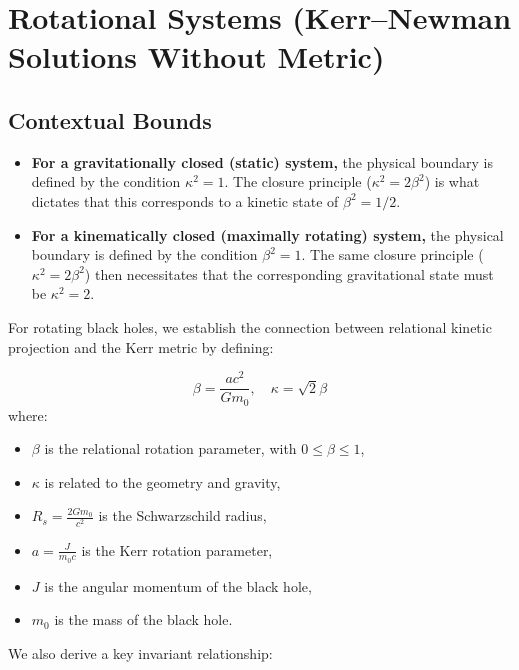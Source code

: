 \documentclass[12pt, a4paper]{article}
\begin{document}
\begin{center}
\end{center}

\section{Rotational Systems (Kerr–Newman Solutions Without Metric)}

\subsection{Contextual Bounds}

\begin{itemize}
    \item \textbf{For a gravitationally closed (static) system,} the physical boundary is defined by the condition $\kappa^2 = 1$. The closure principle ($\kappa^2 = 2\beta^2$) is what dictates that this corresponds to a kinetic state of $\beta^2 = 1/2$.
    \item \textbf{For a kinematically closed (maximally rotating) system,} the physical boundary is defined by the condition $\beta^2 = 1$. The same closure principle ($\kappa^2 = 2\beta^2$) then necessitates that the corresponding gravitational state must be $\kappa^2 = 2$.
\end{itemize}

For rotating black holes, we establish the connection between relational kinetic projection and the Kerr metric by defining:

\[
\beta =\frac{a c^2}{G m_0}, \quad \kappa = \sqrt{2} \beta
\]
where:
\begin{itemize}
    \item \(\beta\) is the relational rotation parameter, with \(0 \leq \beta \leq 1\),
    \item \(\kappa\) is related to the geometry and gravity,
    \item \(R_s = \frac{2 G m_0}{c^2}\) is the Schwarzschild radius,
    \item \(a = \frac{J}{m_0 c}\) is the Kerr rotation parameter,
    \item \(J\) is the angular momentum of the black hole,
    \item \(m_0\) is the mass of the black hole.
\end{itemize}

We also derive a key invariant relationship:
\end{document}
